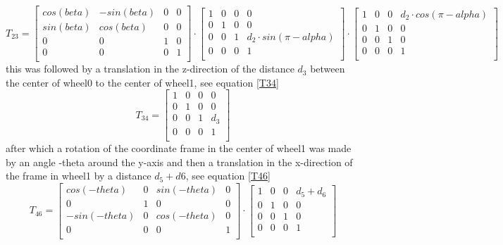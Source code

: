 \begin{equation}
    T_{23} = 
    \begin{bmatrix}
    cos(beta)&-sin(beta)&0&0\\
    sin(beta)&cos(beta)&0&0\\
    0&0&1&0\\
    0&0&0&1\\
    \end{bmatrix}
    \cdot
    \begin{bmatrix}
    1&0&0&0\\
    0&1&0&0\\
    0&0&1&d_2\cdot sin(\pi-alpha)\\
    0&0&0&1\\
    \end{bmatrix}
    \cdot
    \begin{bmatrix}
    1&0&0&d_2\cdot cos(\pi-alpha)\\
    0&1&0&0\\
    0&0&1&0\\
    0&0&0&1\\
    \end{bmatrix}
    \label{T23}
\end{equation}
this was followed by a translation in the z-direction of the distance \(d_3\) between the center of wheel0 to the center of wheel1, see equation \ref{T34}
\begin{equation}
    T_{34} = 
    \begin{bmatrix}
    1&0&0&0\\
    0&1&0&0\\
    0&0&1&d_3\\
    0&0&0&1\\
    \end{bmatrix}
    \label{T34}
\end{equation}
after which a rotation of the coordinate frame in the center of wheel1 was made by an angle -theta around the y-axis and then a translation in the x-direction of the frame in wheel1 by a distance \(d_5 + d6\), see equation \ref{T46}
\begin{equation}
    T_{46} =
    \begin{bmatrix}
    cos(-theta)&0&sin(-theta)&0\\
    0&1&0&0\\
    -sin(-theta)&0&cos(-theta)&0\\
    0&0&0&1\\
    \end{bmatrix}
    \cdot
     \begin{bmatrix}
    1&0&0&d_5 + d_6\\
    0&1&0&0\\
    0&0&1&0\\
    0&0&0&1\\
    \end{bmatrix}
    \label{T46}
\end{equation}
